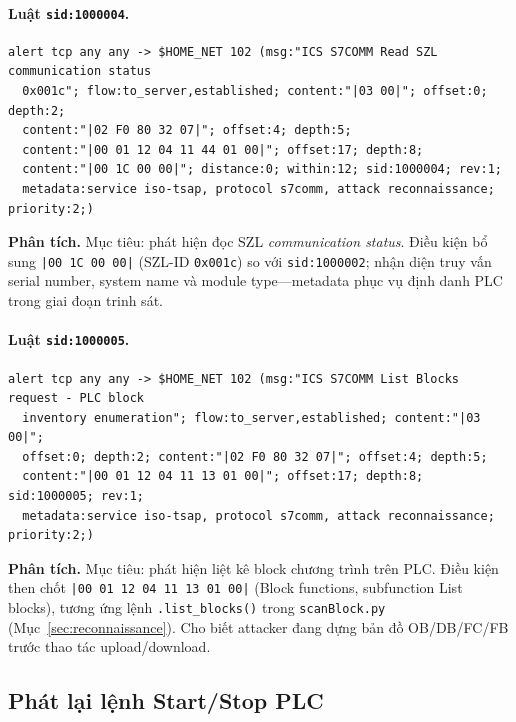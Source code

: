 \documentclass[../main.tex]{subfiles}
\begin{document}
\paragraph{Luật \texttt{sid:1000004}.}
\begin{footnotesize}
\begin{verbatim}
alert tcp any any -> $HOME_NET 102 (msg:"ICS S7COMM Read SZL communication status
  0x001c"; flow:to_server,established; content:"|03 00|"; offset:0; depth:2;
  content:"|02 F0 80 32 07|"; offset:4; depth:5;
  content:"|00 01 12 04 11 44 01 00|"; offset:17; depth:8;
  content:"|00 1C 00 00|"; distance:0; within:12; sid:1000004; rev:1;
  metadata:service iso-tsap, protocol s7comm, attack reconnaissance; priority:2;)
\end{verbatim}
\end{footnotesize}

\noindent\textbf{Phân tích.}
Mục tiêu: phát hiện đọc SZL \emph{communication status}. Điều kiện bổ sung \texttt{|00 1C 00 00|} (SZL-ID \texttt{0x001c}) so với \texttt{sid:1000002}; nhận diện truy vấn serial number, system name và module type---metadata phục vụ định danh PLC trong giai đoạn trinh sát.

\paragraph{Luật \texttt{sid:1000005}.}
\begin{footnotesize}
\begin{verbatim}
alert tcp any any -> $HOME_NET 102 (msg:"ICS S7COMM List Blocks request - PLC block
  inventory enumeration"; flow:to_server,established; content:"|03 00|";
  offset:0; depth:2; content:"|02 F0 80 32 07|"; offset:4; depth:5;
  content:"|00 01 12 04 11 13 01 00|"; offset:17; depth:8; sid:1000005; rev:1;
  metadata:service iso-tsap, protocol s7comm, attack reconnaissance; priority:2;)
\end{verbatim}
\end{footnotesize}

\noindent\textbf{Phân tích.}
Mục tiêu: phát hiện liệt kê block chương trình trên PLC. Điều kiện then chốt \texttt{|00 01 12 04 11 13 01 00|} (Block functions, subfunction List blocks), tương ứng lệnh \texttt{.list\_blocks()} trong \texttt{scanBlock.py} (Mục~\ref{sec:reconnaissance}). Cho biết attacker đang dựng bản đồ OB/DB/FC/FB trước thao tác upload/download.

\subsection{Phát lại lệnh Start/Stop PLC}
\label{sec:rules-start-stop}
\end{document}

